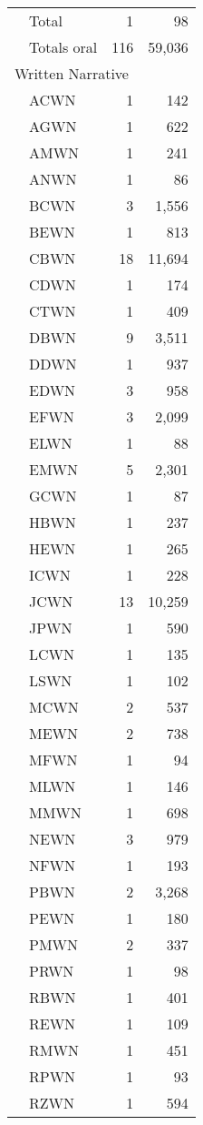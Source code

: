 \begin{longtable}{llrr}
		& Total &  1 & 98\\
		& Totals oral & 116 & 59,036\\\midrule
		\multicolumn{4}{l}{Written Narrative}\\
		& ACWN & 1 & 142\\
		& AGWN & 1 & 622\\
		& AMWN & 1 & 241\\
		& ANWN & 1 & 86\\
		& BCWN & 3 & 1,556\\
		& BEWN & 1 & 813\\
		& CBWN & 18 & 11,694\\
		& CDWN & 1 & 174\\
		& CTWN & 1 & 409\\
		& DBWN & 9 & 3,511\\
		& DDWN & 1 & 937\\
		& EDWN & 3 & 958\\
		& EFWN & 3 & 2,099\\
		& ELWN & 1 & 88\\
		& EMWN & 5 & 2,301\\
		& GCWN & 1 & 87\\
		& HBWN & 1 & 237\\
		& HEWN & 1 & 265\\
		& ICWN & 1 & 228\\
		& JCWN & 13 & 10,259\\
		& JPWN & 1 & 590\\
		& LCWN & 1 & 135\\
		& LSWN & 1 & 102\\
		& MCWN & 2 & 537\\
		& MEWN & 2 & 738\\
		& MFWN & 1 & 94\\
		& MLWN & 1 & 146\\
		& MMWN & 1 & 698\\
		& NEWN & 3 & 979\\
		& NFWN & 1 & 193\\
		& PBWN & 2 & 3,268\\
		& PEWN & 1 & 180\\
		& PMWN & 2 & 337\\
		& PRWN & 1 & 98\\
		& RBWN & 1 & 401\\
		& REWN & 1 & 109\\
		& RMWN & 1 & 451\\
		& RPWN & 1 & 93\\
		& RZWN & 1 & 594\\

\end{longtable}
